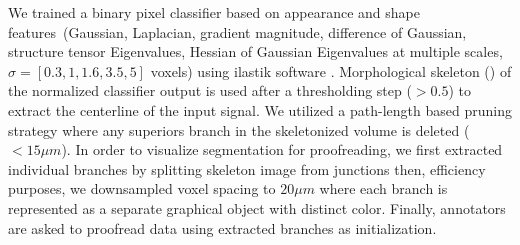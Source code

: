 \documentclass[../main.tex]{subfiles}
\begin{document}
We trained a binary pixel classifier based on appearance and shape features~(Gaussian, Laplacian, gradient magnitude, difference of Gaussian, structure tensor Eigenvalues, Hessian of Gaussian Eigenvalues at multiple scales, $\sigma = [0.3, 1, 1.6, 3.5, 5]$ voxels) using ilastik software \cite{sommer2011ilastik}. Morphological skeleton (\cite{lee1994building}) of the normalized classifier output is used after a thresholding step ($ > 0.5$) to extract the centerline of the input signal. We utilized a path-length based pruning strategy where any superiors branch in the skeletonized volume is deleted ($ < 15\mu m$). In order to visualize segmentation for proofreading, we first extracted individual branches by splitting skeleton image from junctions then, efficiency purposes, we downsampled voxel spacing to $20\mu m$ where each branch is represented as a separate graphical object with distinct color. Finally, annotators are asked to proofread data using extracted branches as initialization.
\end{document}
